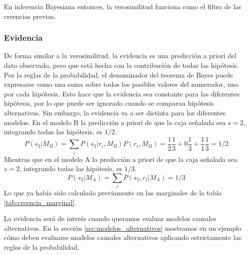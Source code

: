 \documentclass[a4paper,10pt]{book}
\theoremstyle{definition}
\begin{document}

En inferencia Bayesiana entonces, la verosimilitud funciona como el filtro de las creencias previas. 

\subsubsection*{Evidencia}

De forma similar a la verosimilitud, la evidencia es una predicci\'on a priori del dato observado, pero que est\'a hecha con la contribuci\'on de todas las hip\'otesis.
%
Por la reglas de la probabilidad, el denominador del teorema de Bayes puede expresarse como una suma sobre todos los posibles valores del numerador, uno por cada hip\'otesis.
%
Esto hace que la evidencia sea constante para las diferentes hip\'otesis, por lo que puede ser ignorado cuando se comparan hip\'otesis alternativas.
%
Sin embargo, la evidencia va a ser distinta para los diferentes modelos.
%
En el modelo B la predicci\'on a priori de que la caja se\~nalada sea $s=2$, integrando todas las hip\'otesis, es $1/2$. 
%
\begin{equation}
P(s_2|M_B) = \sum_i P(s_2|r_i, M_B) P(r_i, M_B) = \frac{1}{2} \frac{1}{3} + 0 \frac{1}{3} + \frac{1}{1} \frac{1}{3} = 1/2 
\end{equation}
%
Mientras que en el modelo A la predicci\'on a priori de que la caja se\~nalada sea $s=2$, integrando todas las hip\'otesis, es $1/3$. 
%
\begin{equation}
P(s_2|M_A) = \sum_i P(s_2,r_i| M_A) = 1/3 
\end{equation}
%
Lo que ya hab\'ia sido calculado previamente en las marginales de la tabla \ref{tab:creencia_marginal}.


La evidencia ser\'a de inter\'es cuando queramos evaluar modelos causales alternativos.
%
En la secci\'on \ref{sec:modelos_alternativos} mostramos en un ejemplo c\'omo deben evaluarse modelos causales alternativos aplicando estrictamente las reglas de la probabilidad.
\end{document}
